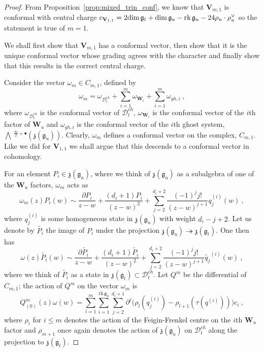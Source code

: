 \documentclass[a4paper]{article}
\def\dim{{\rm dim}}
\def\gf{\mathfrak{g}}
\def \zf{\mathfrak{z}}
\def \rk{\mathrm{rk}}
\newcommand{\Li}[1]{\mathrm{\bigwedge}\,^{\frac{\infty}{2}+#1}}
\def\D{\mathcal{D}^{ch}}
\def\W{\mathbf{W}}
\def\V{\mathbf{V}}
\begin{document}
\begin{proof}
From Proposition~\ref{prop:mixed_trin_conf}, we know that $\V_{m,1}$ is conformal with central charge $c_{\V_{1,1}} = 2\dim\, \gf_t + \dim\,\gf_u -\rk\,\gf_u -24 \rho_u\cdot\rho_u^\vee$ so the statement is true of $m=1$.

We shall first show that $\V_{m,1}$ has a conformal vector, then show that it is the unique conformal vector whose grading agrees with the character and finally show that this results in the correct central charge.

Consider the vector $\omega_m\in C_{m,1}$, defined by
\begin{equation*}
	\omega_m = \omega_{\D_t} + \sum_{i=1}^{m} \omega_{\W_i}+\sum_{i=1}^m \omega_{gh,i} ~,
\end{equation*}
where $\omega_{\D_t}$ is the conformal vector of $\D_t$, $\omega_{\W_i}$ is the conformal vector of the $i$th factor of $\W_u$ and $\omega_{gh,i}$ is the conformal vector of the $i$th ghost system, $\Li{\bullet}(\zf(\gf_u))$. Clearly, $\omega_m$ defines a conformal vector on the complex, $C_{m,1}$. Like we did for $\V_{1,1}$ we shall argue that this descends to a conformal vector in cohomology.

For an element $P_i\in\zf(\gf_u)$, where we think of $\zf(\gf_u)$ as a subalgebra of one of the $\W_u$ factors, $\omega_m$ acts as
\begin{equation*}
	\omega_m(z) P_i(w) \sim \frac{\partial P_i}{z-w} +\frac{(d_i+1) P_i}{(z-w)^2}+\sum_{j=2}^{d_i+2}\frac{(-1)^j j!}{(z-w)^{j+1}} q_j^{(i)}(w)~,
\end{equation*}
where $q_j^{(i)}$ is some homogeneous state in $\zf(\gf_u)$ with weight $d_i-j+2$. Let us denote by $\widetilde{P_i}$ the image of $P_i$ under the projection $\zf(\gf_u)\twoheadrightarrow \zf(\gf_t)$.
One then has
\begin{equation*}
	\omega(z) \widetilde{P_i}(w) \sim \frac{\partial \widetilde{P_i}}{z-w} +\frac{(d_i+1) \widetilde{P_i}}{(z-w)^2}+\sum_{j=2}^{d_i+2}\frac{(-1)^j j!}{(z-w)^{j+1}} \widetilde{q_j}^{(i)}(w)~,
\end{equation*}
where we think of $\widetilde{P_i}$ as a state in $\zf(\gf_t)\subset\D_t$. Let $Q^m$ be the differential of $C_{m,1}$; the action of $Q^m$ on the vector $\omega_m$ is
\begin{equation*}
	Q^m_{(0)}(z) \omega(w) = \sum_{l=1}^{m}\sum_{i=1}^{\mathrm{rk}\,\gf_u}\sum_{j=2}^{d_i+1} \partial^j \big(\rho_l(q_j^{(i)}) -\rho_{l+1}(\tau(q^{(i)}))\big)c_i ~,
\end{equation*}
where $\rho_i$ for $i\leqslant m$ denotes the action of the Feigin-Frenkel centre on the $i$th $\W_u$ factor and $\rho_{m+1}$ once again denotes the action of $\zf(\gf_u)$ on $\D_t$ along the projection to $\zf(\gf_t)$.


\end{proof}
\end{document}
